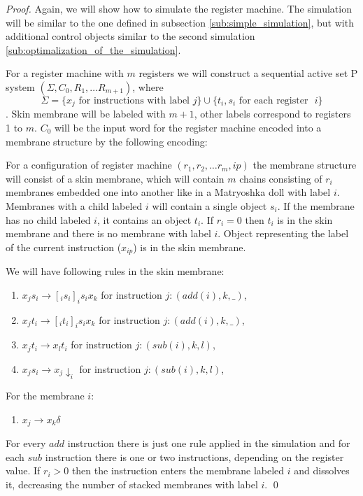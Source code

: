 \documentclass[submission,copyright,creativecommons]{../lib/lncs/llncs}
\begin{document}
\begin{proof}
  Again, we will show how to simulate the register machine. The simulation will be similar to the one defined in subsection \ref{sub:simple_simulation}, but with additional control objects similar to the second simulation \ref{sub:optimalization_of_the_simulation}.

  For a register machine with $m$ registers we will construct a sequential active set P system $(\Sigma, C_0, R_1, \ldots R_{m+1})$, where $$\Sigma = \{x_j \text{~for instructions with label~} j\}\cup\{t_i, s_i \text{~for each register ~}i\}$$. Skin membrane will be labeled with $m+1$, other labels correspond to registers 1 to $m$. $C_0$ will be the input word for the register machine encoded into a membrane structure by the following encoding: 

  For a configuration of register machine $(r_1, r_2, \ldots r_m, ip)$ the membrane structure will consist of a skin membrane, which will contain $m$ chains consisting of $r_i$ membranes embedded one into another like in a Matryoshka doll with label $i$. Membranes with a child labeled $i$ will contain a single object $s_i$. If the membrane has no child labeled $i$, it contains an object $t_i$. If $r_i = 0$ then $t_i$ is in the skin membrane and there is no membrane with label $i$. Object representing the label of the current instruction ($x_{ip}$) is in the skin membrane.

  We will have following rules in the skin membrane:
  \begin{enumerate}
    \item\label{wrap_skin_add_s} $x_j s_i\rightarrow [_i s_i ]_i s_i x_k$ for instruction $j: (add(i), k, \_)$,
    \item\label{wrap_skin_add_t} $x_j t_i\rightarrow [_i t_i ]_i s_i x_k$ for instruction $j: (add(i), k, \_)$,
    \item\label{wrap_skin_sub_t} $x_j t_i\rightarrow x_l t_i$ for instruction $j: (sub(i), k, l)$,
    \item\label{wrap_skin_sub_s} $x_j s_i\rightarrow x_j\downarrow_i$ for instruction $j: (sub(i), k, l)$,
  \end{enumerate}

  For the membrane $i$:
  \begin{enumerate}[resume]
    \item\label{wrap_inner_dissolve} $x_j \rightarrow x_k\delta$
  \end{enumerate}

  For every $add$ instruction there is just one rule applied in the simulation and for each $sub$ instruction there is one or two instructions, depending on the register value. If $r_i>0$ then the instruction enters the membrane labeled $i$ and dissolves it, decreasing the number of stacked membranes with label $i$. \qed
\end{proof}
\end{document}
